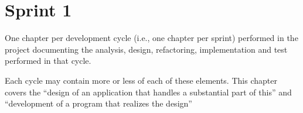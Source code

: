 \chapter{Sprint 1}

One chapter per development cycle (i.e., one chapter per sprint) performed in the project documenting the analysis, design, refactoring, implementation and test performed in that cycle.

Each cycle may contain more or less of each of these elements.
This chapter covers the “design of an application that handles a substantial part of this” and “development of a program that realizes the design”


